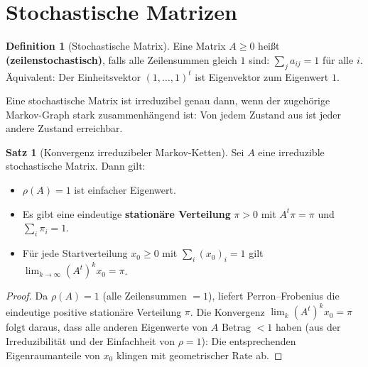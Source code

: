 ﻿\documentclass[a4paper,12pt]{report}
\theoremstyle{definition}
\newtheorem{definition}{Definition}
\newtheorem{satz}{Satz}
\begin{document}
\section{Stochastische Matrizen}

\begin{definition}[Stochastische Matrix]
    Eine Matrix $A \geq 0$ heißt \textbf{(zeilenstochastisch)}, falls
    alle Zeilensummen gleich $1$ sind: $\sum_j a_{ij} = 1$ für alle $i$.
    Äquivalent: Der Einheitsvektor $(1, \ldots, 1)^t$ ist Eigenvektor
    zum Eigenwert $1$.

    Eine stochastische Matrix ist irreduzibel genau dann, wenn der zugehörige
    Markov-Graph stark zusammenhängend ist: Von jedem Zustand aus
    ist jeder andere Zustand erreichbar.
\end{definition}

\begin{satz}[Konvergenz irreduzibeler Markov-Ketten]
    Sei $A$ eine irreduzible stochastische Matrix. Dann gilt:
    \begin{itemize}
        \item[-] $\rho(A) = 1$ ist einfacher Eigenwert.
        \item[-] Es gibt eine eindeutige \textbf{stationäre Verteilung}
              $\pi > 0$ mit $A^t \pi = \pi$ und $\sum_i \pi_i = 1$.
        \item[-] Für jede Startverteilung $x_0 \geq 0$ mit $\sum_i (x_0)_i = 1$
              gilt $\lim_{k \to \infty} (A^t)^k x_0 = \pi$.
    \end{itemize}
\end{satz}
\begin{proof}
    Da $\rho(A) = 1$ (alle Zeilensummen $=1$), liefert Perron--Frobenius
    die eindeutige positive stationäre Verteilung $\pi$.
    Die Konvergenz $\lim_k (A^t)^k x_0 = \pi$ folgt daraus, dass alle anderen
    Eigenwerte von $A$ Betrag $< 1$ haben (aus der Irreduzibilität und der
    Einfachheit von $\rho = 1$): Die entsprechenden Eigenraumanteile von
    $x_0$ klingen mit geometrischer Rate ab.
\end{proof}
\end{document}
